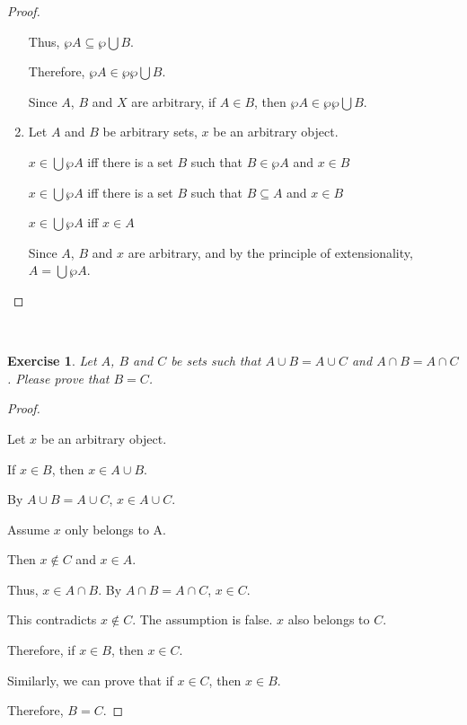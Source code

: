 \documentclass[12pt,a4paper,utf8]{article}
\theoremstyle{plain}
\newtheorem{exercise}{Exercise}
\begin{document}
\begin{proof}
\begin{enumerate}
    Thus, $\wp A \subseteq \wp \bigcup B$.
    
    Therefore, $\wp A \in \wp \wp \bigcup B$.
    
    Since $A$, $B$ and $X$ are arbitrary, if $A \in B$, then $\wp A \in \wp \wp \bigcup B$.
    
    \item
    Let $A$ and $B$ be arbitrary sets, $x$ be an arbitrary object.
    
    $x \in \bigcup \wp A$ iff there is a set $B$ such that $B \in \wp A$ and $x \in B$
    
    $x \in \bigcup \wp A$ iff there is a set $B$ such that $B \subseteq A$ and $x \in B$
    
    $x \in \bigcup \wp A$ iff $x \in A$
    
    Since $A$, $B$ and $x$ are arbitrary, and by the principle of extensionality, $A = \bigcup \wp A$.
    
\end{enumerate} 
\end{proof}

\ \\
\begin{exercise}
Let $A$, $B$ and $C$ be sets such that $A \cup B = A \cup C$ and $A \cap B = A \cap C$. 
Please prove that $B = C$. 
\end{exercise}

\begin{proof}\ 

    Let $x$ be an arbitrary object.
    
        If $x \in B$, then $x \in A \cup B$.
        
        By $A \cup B = A \cup C$, $x \in A \cup C$.
        
            Assume $x$ only belongs to A.
            
            Then $x \notin C$ and $x \in A$.
            
            Thus, $x \in A \cap B$. By $A \cap B = A \cap C$, $x \in C$. 
            
            This contradicts $x \notin C$. The assumption is false. $x$ also belongs to $C$.
            
        Therefore, if $x \in B$, then $x \in C$.
        
        Similarly, we can prove that if $x \in C$, then $x \in B$.
        
        Therefore, $B = C$.
            
            
        
        

\end{proof}
\end{document}
